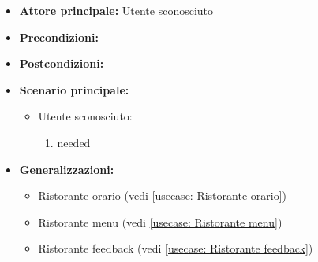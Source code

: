 \label{usecase:Dettaglio ristorante}
\begin{itemize}
\item \textbf{Attore principale:}  Utente sconosciuto
\item \textbf{Precondizioni:}
\item \textbf{Postcondizioni:}
\item \textbf{Scenario principale:}
\begin{itemize}
\item  Utente sconosciuto:
\begin{enumerate}
\item needed
\end{enumerate}
\end{itemize}
\item \textbf{Generalizzazioni:}
\begin{itemize}
\item  Ristorante orario (vedi \autoref{usecase: Ristorante orario})
\item  Ristorante menu (vedi \autoref{usecase: Ristorante menu})
\item  Ristorante feedback (vedi \autoref{usecase: Ristorante feedback})
\end{itemize}
\end{itemize}